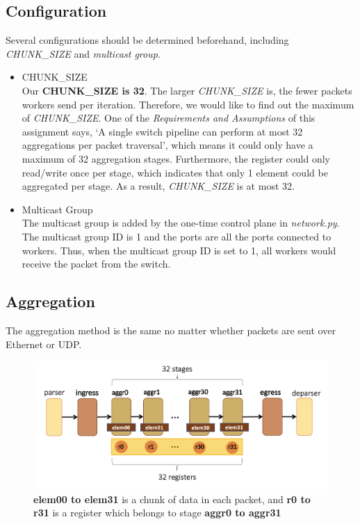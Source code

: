\documentclass[a4paper,11pt]{article}
\begin{document}
\subsection{Configuration}
Several configurations should be determined beforehand, including \textit{CHUNK\_SIZE} and \textit{multicast group}.\\
\begin{itemize}
    \item CHUNK\_SIZE \\
    \label{chunksize}
    Our \textbf{CHUNK\_SIZE is 32}. The larger \textit{CHUNK\_SIZE} is, the fewer packets workers send per iteration. Therefore, we would like to find out the maximum of \textit{CHUNK\_SIZE}. One of the \textit{Requirements and Assumptions} of this assignment says, ‘A single switch pipeline can perform at most 32 aggregations per packet traversal’, which means it could only have a maximum of 32 aggregation stages. Furthermore, the register could only read/write once per stage, which indicates that only 1 element could be aggregated per stage. As a result, \textit{CHUNK\_SIZE} is at most 32.
    \item Multicast Group \\
    The multicast group is added by the one-time control plane in \textit{network.py}. The multicast group ID is 1 and the ports are all the ports connected to workers. Thus, when the multicast group ID is set to 1, all workers would receive the packet from the switch.
\end{itemize}
\subsection{Aggregation}
The aggregation method is the same no matter whether packets are sent over Ethernet or UDP.

\begin{figure}[htbp]
    \centering
    \includegraphics[width=13cm]{dataflow.png}
    \caption{\textbf{elem00 to elem31} is a chunk of data in each packet, and \textbf{r0 to r31} is a register which belongs to stage \textbf{aggr0 to aggr31}}
    \label{fig:df}
\end{figure}
\end{document}
